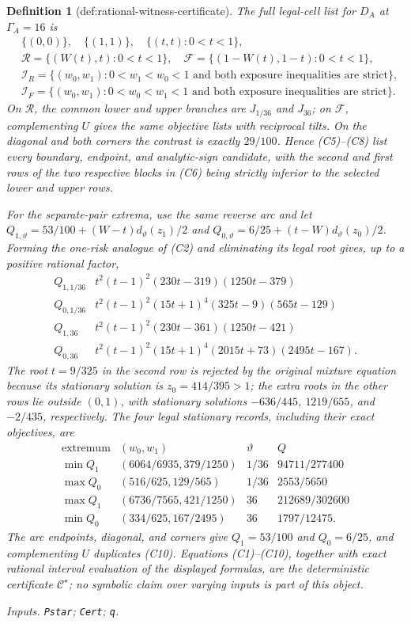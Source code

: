 \documentclass{article}
\newtheorem{definition}{Definition}
\begin{document}
\begin{definition}[def:rational-witness-certificate]
The full legal-cell list for \(D_A\) at \(\Gamma_A=16\) is
\[
\begin{split}
&\{(0,0)\},\quad\{(1,1)\},\quad
\{(t,t):0<t<1\},\\
&\mathcal R=\{(W(t),t):0<t<1\},\quad
\mathcal F=\{(1-W(t),1-t):0<t<1\},\\
&\mathcal I_R=\{(w_0,w_1):0<w_1<w_0<1\text{ and both exposure inequalities are strict}\},\\
&\mathcal I_F=\{(w_0,w_1):0<w_0<w_1<1\text{ and both exposure inequalities are strict}\}.
\end{split}
\tag{C8}
\]
On \(\mathcal R\), the common lower and upper branches are \(J_{1/36}\) and \(J_{36}\); on \(\mathcal F\), complementing \(U\) gives the same objective lists with reciprocal tilts.  On the diagonal and both corners the contrast is exactly \(29/100\).  Hence (C5)--(C8) list every boundary, endpoint, and analytic-sign candidate, with the second and first rows of the two respective blocks in (C6) being strictly inferior to the selected lower and upper rows.

For the separate-pair extrema, use the same reverse arc and let \(Q_{1,\vartheta}=53/100+(W-t)d_\vartheta(z_1)/2\) and \(Q_{0,\vartheta}=6/25+(t-W)d_\vartheta(z_0)/2\).  Forming the one-risk analogue of (C2) and eliminating its legal root gives, up to a positive rational factor,
\[
\begin{array}{c|l}
Q_{1,1/36}&t^2(t-1)^2(230t-319)(1250t-379)\\
Q_{0,1/36}&t^2(t-1)^2(15t+1)^4(325t-9)(565t-129)\\
Q_{1,36}&t^2(t-1)^2(230t-361)(1250t-421)\\
Q_{0,36}&t^2(t-1)^2(15t+1)^4(2015t+73)(2495t-167).
\end{array}
\tag{C9}
\]
The root \(t=9/325\) in the second row is rejected by the original mixture equation because its stationary solution is \(z_0=414/395>1\); the extra roots in the other rows lie outside \((0,1)\), with stationary solutions \(-636/445\), \(1219/655\), and \(-2/435\), respectively.  The four legal stationary records, including their exact objectives, are
\[
\begin{array}{c|c|c|c}
\text{extremum}&(w_0,w_1)&\vartheta&Q\\ \hline
\min Q_1&(6064/6935,379/1250)&1/36&94711/277400\\
\max Q_0&(516/625,129/565)&1/36&2553/5650\\
\max Q_1&(6736/7565,421/1250)&36&212689/302600\\
\min Q_0&(334/625,167/2495)&36&1797/12475.
\end{array}
\tag{C10}
\]
The arc endpoints, diagonal, and corners give \(Q_1=53/100\) and \(Q_0=6/25\), and complementing \(U\) duplicates (C10).  Equations (C1)--(C10), together with exact rational interval evaluation of the displayed formulas, are the deterministic certificate \(\mathcal C^\star\); no symbolic claim over varying inputs is part of this object.
\par\smallskip\noindent\emph{Inputs.} \texttt{Pstar}; \texttt{Cert}; \texttt{q}.
\end{definition}
\end{document}
